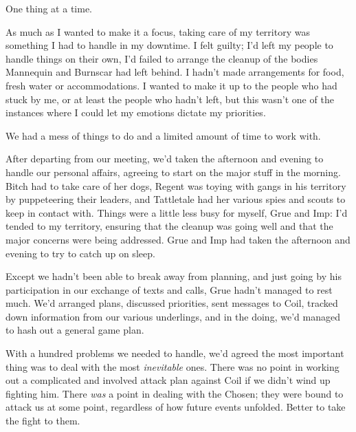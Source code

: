 





One thing at a time.



As much as I wanted to make it a focus, taking care of my territory was something I had to handle in my downtime.  I felt guilty; I'd left my people to handle things on their own, I'd failed to arrange the cleanup of the bodies Mannequin and Burnscar had left behind.  I hadn't made arrangements for food, fresh water or accommodations.  I wanted to make it up to the people who had stuck by me, or at least the people who hadn't left, but this wasn't one of the instances where I could let my emotions dictate my priorities.



We had a mess of things to do and a limited amount of time to work with.



After departing from our meeting, we'd taken the afternoon and evening to handle our personal affairs, agreeing to start on the major stuff in the morning.  Bitch had to take care of her dogs, Regent was toying with gangs in his territory by puppeteering their leaders, and Tattletale had her various spies and scouts to keep in contact with.  Things were a little less busy for myself, Grue and Imp: I'd tended to my territory, ensuring that the cleanup was going well and that the major concerns were being addressed.  Grue and Imp had taken the afternoon and evening to try to catch up on sleep.



Except we hadn't been able to break away from planning, and just going by his participation in our exchange of texts and calls, Grue hadn't managed to rest much.  We'd arranged plans, discussed priorities, sent messages to Coil, tracked down information from our various underlings, and in the doing, we'd managed to hash out a general game plan.



With a hundred problems we needed to handle, we'd agreed the most important thing was to deal with the most \emph{inevitable} ones.  There was no point in working out a complicated and involved attack plan against Coil if we didn't wind up fighting him.  There \emph{was} a point in dealing with the Chosen; they were bound to attack us at some point, regardless of how future events unfolded.  Better to take the fight to them.




